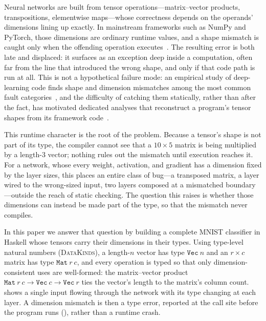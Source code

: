 \documentclass[sigconf,nonacm]{acmart}
\begin{document}
Neural networks are built from tensor operations---matrix--vector products,
transpositions, elementwise maps---whose correctness depends on the operands'
dimensions lining up exactly. In mainstream frameworks such as NumPy and PyTorch,
those dimensions are ordinary runtime values, and a shape mismatch is caught only
when the offending operation executes~\cite{numpy,pytorch}. The resulting error
is both late and displaced: it surfaces as an exception deep inside a
computation, often far from the line that introduced the wrong shape, and only if
that code path is run at all. This is not a hypothetical failure mode: an
empirical study of deep-learning code finds shape and dimension mismatches among
the most common fault categories~\cite{zhang2018empirical}, and the difficulty of
catching them statically, rather than after the fact, has motivated dedicated
analyses that reconstruct a program's tensor shapes from its framework
code~\cite{lagouvardos2020pythia}.

This runtime character is the root of the problem. Because a tensor's shape is
not part of its type, the compiler cannot see that a $10\times5$ matrix is being
multiplied by a length-$3$ vector; nothing rules out the mismatch until execution
reaches it. For a network, whose every weight, activation, and gradient has a
dimension fixed by the layer sizes, this places an entire class of bug---a
transposed matrix, a layer wired to the wrong-sized input, two layers composed at
a mismatched boundary---outside the reach of static checking. The question this
raises is whether those dimensions can instead be made part of the type, so that
the mismatch never compiles.

In this paper we answer that question by building a complete MNIST classifier in
Haskell whose tensors carry their dimensions in their types. Using type-level
natural numbers (\textsc{DataKinds}), a length-$n$ vector has type
$\mathtt{Vec}\ n$ and an $r\times c$ matrix has type $\mathtt{Mat}\ r\ c$, and
every operation is typed so that only dimension-consistent uses are well-formed:
the matrix--vector product $\mathtt{Mat}\ r\ c \to \mathtt{Vec}\ c \to
\mathtt{Vec}\ r$ ties the vector's length to the matrix's column count.
 shows a single input flowing through the network with its
type changing at each layer. A dimension mismatch is then a type error, reported
at the call site before the program runs (), rather than a
runtime crash.
\end{document}
